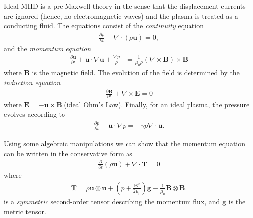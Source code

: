 \documentclass[12pt]{article}
\theoremstyle{definition}
\theoremstyle{definition}
\theoremstyle{definition}
\newcommand{\pfrac}[2]{\frac{\partial #1}{\partial #2}}
\newcommand{\mvec}[1]{\mathbf{#1}}
\begin{document}
Ideal MHD is a pre-Maxwell theory in the sense that the displacement
currents are ignored (hence, no electromagnetic waves) and the plasma
is treated as a conducting fluid. The equations consist of the
\emph{continuity} equation
\begin{align}
  \pfrac{\rho}{t} + \nabla\cdot(\rho\mvec{u}) = 0,
\end{align}
and the \emph{momentum equation}
\begin{align}
  \frac{\partial \mathbf{u}}{\partial t}+\mathbf{u} \cdot \nabla \mathbf{u}
  +\frac{\nabla p}{\rho} &= 
                           {\frac{1}{\mu_{0}\rho}(\nabla \times \mathbf{B}) \times \mathbf{B}}
                           \label{eq:mhd-mom}  
\end{align}
where $\mvec{B}$ is the magnetic field. The evolution of the field is
determined by the \emph{induction equation}
\begin{align}
  \pfrac{\mvec{B}}{t} + \nabla\times\mvec{E} = 0
\end{align}
where $\mvec{E} = -\mvec{u}\times\mvec{B}$ (ideal Ohm's Law). Finally,
for an ideal plasma, the pressure evolves according to
\begin{align}
  \pfrac{p}{t} + \mvec{u}\cdot\nabla p = -\gamma p
  \nabla\cdot\mvec{u}.
  \label{eq:mhd-press}
\end{align}

Using some algebraic manipulations we can show that the momentum
equation can be written in the conservative form as
\begin{align}
  \frac{\partial}{\partial t}(\rho\mvec{u})
  + \nabla\cdot \mvec{T} = 0
  \label{eq:mhd-mom-cons}
\end{align}
where
\begin{align}
  \mvec{T} = \rho\mvec{u}\otimes\mvec{u}
  +
  \left(p + \frac{\mvec{B}^2}{2\mu_0} \right)\mvec{g}
  -\frac{1}{\mu_0} \mvec{B}\otimes\mvec{B}.
\end{align}
is a \emph{symmetric} second-order tensor describing the momentum
flux, and $\mvec{g}$ is the metric tensor.
\end{document}
